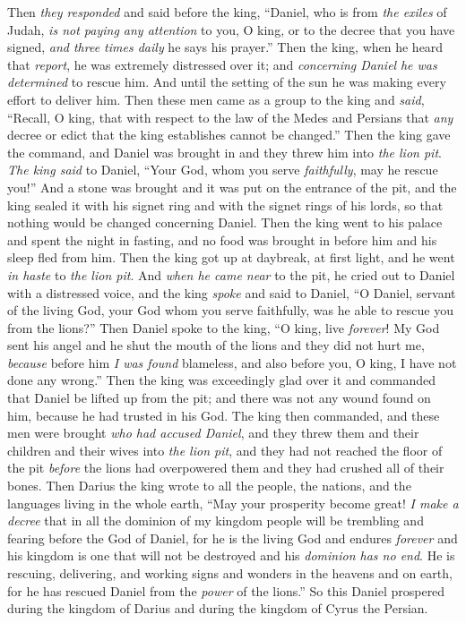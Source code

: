 \begin{biblechapter}
 Then \textit{they responded} and said before the king, “Daniel, who is from \textit{the exiles} of Judah, \textit{is not paying any attention} to you, O king, or to the decree that you have signed, \textit{and three times daily} he says his prayer.”
\verse Then the king, when he heard that \textit{report}, he was extremely distressed over it; and \textit{concerning Daniel} \textit{he was determined} to rescue him. And until the setting of the sun he was making every effort to deliver him.
\verse Then these men came as a group to the king and \textit{said}, “Recall, O king, that with respect to the law of the Medes and Persians that \textit{any} decree or edict that the king establishes cannot be changed.”
\verse Then the king gave the command, and Daniel was brought in and they threw him into \textit{the lion pit}. \textit{The king said} to Daniel, “Your God, whom you serve \textit{faithfully}, may he rescue you!”
\verse And a stone was brought and it was put on the entrance of the pit, and the king sealed it with his signet ring and with the signet rings of his lords, so that nothing would be changed concerning Daniel.
\verse Then the king went to his palace and spent the night in fasting, and no food was brought in before him and his sleep fled from him.
\verse Then the king got up at daybreak, at first light, and he went \textit{in haste} to \textit{the lion pit}.
\verse And \textit{when he came near} to the pit, he cried out to Daniel with a distressed voice, and the king \textit{spoke} and said to Daniel, “O Daniel, servant of the living God, your God whom you serve faithfully, was he able to rescue you from the lions?”
\verse Then Daniel spoke to the king, “O king, live \textit{forever}!
\verse My God sent his angel and he shut the mouth of the lions and they did not hurt me, \textit{because} before him \textit{I was found} blameless, and also before you, O king, I have not done any wrong.”
\verse Then the king was exceedingly glad over it and commanded that Daniel be lifted up from the pit; and there was not any wound found on him, because he had trusted in his God.
\verse The king then commanded, and these men were brought \textit{who had accused Daniel}, and they threw them and their children and their wives into \textit{the lion pit}, and they had not reached the floor of the pit \textit{before} the lions had overpowered them and they had crushed all of their bones.
 Then Darius the king wrote to all the people, the nations, and the languages living in the whole earth, “May your prosperity become great!
\verse \textit{I make a decree} that in all the dominion of my kingdom people will be trembling and fearing before the God of Daniel, for he is the living God and endures \textit{forever} and his kingdom is one that will not be destroyed and his \textit{dominion has no end}.
\verse He is rescuing, delivering, and working signs and wonders in the heavens and on earth, for he has rescued Daniel from the \textit{power} of the lions.”
\verse So this Daniel prospered during the kingdom of Darius and during the kingdom of Cyrus the Persian.
\end{biblechapter}

